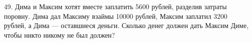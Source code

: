 49. Дима и Максим хотят вместе заплатить 5600 рублей, разделив затраты поровну. Дима дал Максиму взаймы 10000 рублей, Максим заплатил 3200 рублей, а Дима --- оставшиеся деньги. Сколько денег должен дать Максим Диме, чтобы никто никому не был должен?\\
